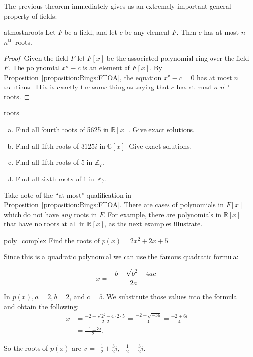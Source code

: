 The previous theorem immediately gives us an extremely important general property of fields:

\begin{prop}{atmostnroots}
Let $F$ be a field, and let $c$ be any element $F$.  Then $c$ has at most $n$ $n^{\text{th}}$ roots.
\end {prop}


\begin{proof}
Given the field $F$ let $F[x]$ be the associated polynomial ring over the field $F$. The polynomial $x^n-c$ is an element of $F[x]$. By Proposition~\ref{proposition:Rings:FTOA}, the equation $x^n-c=0$ has at most $n$ solutions.  This is exactly the same thing as saying that $c$ has at most $n$ $n^{\text{th}}$ roots.
\end {proof}

\begin{exercise}{roots}
\begin {enumerate}[(a)]
\item
Find all fourth roots of 5625 in $\mathbb{R}[x]$. Give exact solutions.
\item
Find all fifth roots of $3125i$ in $\mathbb{C}[x]$. Give exact solutions. 
\item
Find all fifth roots of 5 in $\mathbb{Z}_7$.
\item
Find all sixth roots of 1 in $\mathbb{Z}_7$.
\end{enumerate}
\end{exercise}


Take note of the ``at most'' qualification in Proposition~\ref{proposition:Rings:FTOA}. There are cases of polynomials in $F[x]$ which do not have  \emph{any} roots in $F$. For example, there are polynomials in $\mathbb{R}[x]$ that have no roots at all in $\mathbb{R}[x]$, as the next examples illustrate.

\begin{example}{poly_complex} 
Find the roots of $p(x)=2x^2+2x+5$.

Since this is a quadratic polynomial we can use the famous quadratic formula:

$$x=\frac {-b \pm \sqrt{b^2-4ac}}{2a}$$

In $p(x), a=2, b=2$, and $c=5.$ We substitute those values into the formula and obtain the following:
\begin{align*}
x&=\frac {-2 \pm \sqrt{2^2-4\cdot 2\cdot 5}}{2\cdot 2}=\frac {-2 \pm \sqrt{-36}}{4}=\frac {-2 \pm 6i}{4}\\
&=\frac {-1 \pm 3i}{2}.
\end{align*}

So the roots of $p(x)$ are $x$ ={$-\frac{1}{2}+\frac{3}{2}i, -\frac{1}{2}-\frac{3}{2}i$}.
\end{example}

